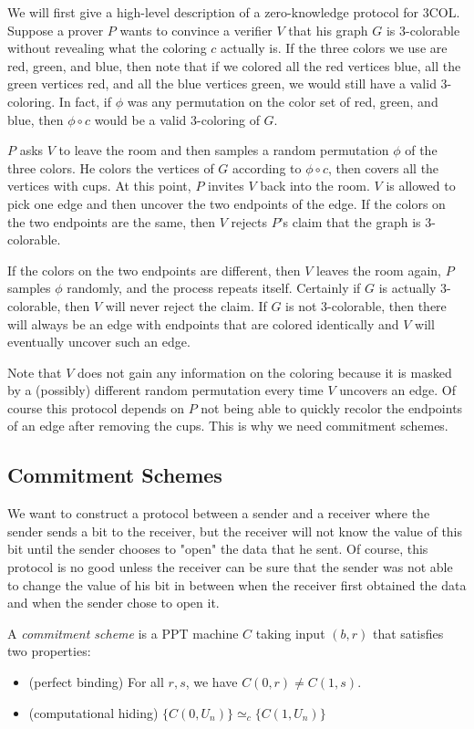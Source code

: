 \documentclass[12pt]{tufte-book}
\begin{document}
We will first give a high-level description of a zero-knowledge protocol for 3COL. Suppose a prover $P$ wants to convince a verifier $V$ that his graph $G$ is 3-colorable without revealing what the coloring $c$ actually is. If the three colors we use are red, green, and blue, then note that if we colored all the red vertices blue, all the green vertices red, and all the blue vertices green, we would still have a valid 3-coloring. In fact, if $\phi$ was any permutation on the color set of red, green, and blue, then $\phi \circ c$ would be a valid 3-coloring of $G$.

$P$ asks $V$ to leave the room and then samples a random permutation $\phi$ of the three colors. He colors the vertices of $G$ according to $\phi \circ c$, then covers all the vertices with cups. At this point, $P$ invites $V$ back into the room. $V$ is allowed to pick one edge and then uncover the two endpoints of the edge. If the colors on the two endpoints are the same, then $V$ rejects $P$'s claim that the graph is 3-colorable.

If the colors on the two endpoints are different, then $V$ leaves the room again, $P$ samples $\phi$ randomly, and the process repeats itself. Certainly if $G$ is actually 3-colorable, then $V$ will never reject the claim. If $G$ is not 3-colorable, then there will always be an edge with endpoints that are colored identically and $V$ will eventually uncover such an edge.

Note that $V$ does not gain any information on the coloring because it is masked by a (possibly) different random permutation every time $V$ uncovers an edge. Of course this protocol depends on $P$ not being able to quickly recolor the endpoints of an edge after removing the cups. This is why we need commitment schemes.

\subsection{Commitment Schemes}

We want to construct a protocol between a sender and a receiver where the sender sends a bit to the receiver, but the receiver will not know the value of this bit until the sender chooses to "open" the data that he sent. Of course, this protocol is no good unless the receiver can be sure that the sender was not able to change the value of his bit in between when the receiver first obtained the data and when the sender chose to open it.

\begin{definition}
A \emph{commitment scheme} is a PPT machine $C$ taking input $(b,r)$ that satisfies two properties: \begin{itemize}
\item (perfect binding) For all $r, s$, we have $C(0,r) \neq C(1,s)$.

\item (computational hiding) $\{ C(0, U_n) \} \simeq_c \{ C(1, U_n) \}$

\end{itemize}
\end{definition}
\end{document}
